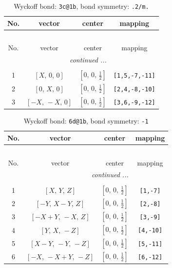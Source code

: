 \documentclass[fleqn,8pt]{jsarticle}
\begin{document}
\begin{longtable}{cccc}
\caption{Wyckoff bond: {\tt 3c@1b}, bond symmetry: {\tt .2/m.}}
 \\
 \hline \hline
No. & vector & center & mapping \\ \hline \endfirsthead

\multicolumn{3}{l}{\tablename\ \thetable{}} \\
 \hline \hline
No. & vector & center & mapping \\ \hline \endhead

 \hline \hline
\multicolumn{3}{r}{\footnotesize\it continued ...} \\ \endfoot

 \hline \hline
\multicolumn{3}{r}{} \\ \endlastfoot

1 & $\left[ X,\, 0,\, 0 \right]$ & $\left[ 0,\, 0,\, \frac{1}{2} \right]$ & {\tt [1,5,-7,-11]} \\ \hline
2 & $\left[ 0,\, X,\, 0 \right]$ & $\left[ 0,\, 0,\, \frac{1}{2} \right]$ & {\tt [2,4,-8,-10]} \\ \hline
3 & $\left[ - X,\, - X,\, 0 \right]$ & $\left[ 0,\, 0,\, \frac{1}{2} \right]$ & {\tt [3,6,-9,-12]} \\
\end{longtable}
\renewcommand{\arraystretch}{1.2}
\begin{longtable}{cccc}
\caption{Wyckoff bond: {\tt 6d@1b}, bond symmetry: {\tt -1}}
 \\
 \hline \hline
No. & vector & center & mapping \\ \hline \endfirsthead

\multicolumn{3}{l}{\tablename\ \thetable{}} \\
 \hline \hline
No. & vector & center & mapping \\ \hline \endhead

 \hline \hline
\multicolumn{3}{r}{\footnotesize\it continued ...} \\ \endfoot

 \hline \hline
\multicolumn{3}{r}{} \\ \endlastfoot

1 & $\left[ X,\, Y,\, Z \right]$ & $\left[ 0,\, 0,\, \frac{1}{2} \right]$ & {\tt [1,-7]} \\ \hline
2 & $\left[ - Y,\, X - Y,\, Z \right]$ & $\left[ 0,\, 0,\, \frac{1}{2} \right]$ & {\tt [2,-8]} \\ \hline
3 & $\left[ - X + Y,\, - X,\, Z \right]$ & $\left[ 0,\, 0,\, \frac{1}{2} \right]$ & {\tt [3,-9]} \\ \hline
4 & $\left[ Y,\, X,\, - Z \right]$ & $\left[ 0,\, 0,\, \frac{1}{2} \right]$ & {\tt [4,-10]} \\ \hline
5 & $\left[ X - Y,\, - Y,\, - Z \right]$ & $\left[ 0,\, 0,\, \frac{1}{2} \right]$ & {\tt [5,-11]} \\ \hline
6 & $\left[ - X,\, - X + Y,\, - Z \right]$ & $\left[ 0,\, 0,\, \frac{1}{2} \right]$ & {\tt [6,-12]} \\
\end{longtable}
\end{document}
